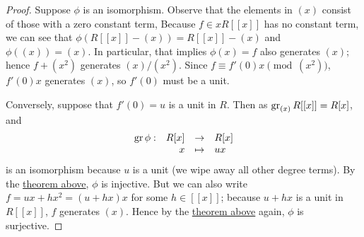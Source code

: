 \begin{proof}
    Suppose \(\phi\) is an isomorphism.
    Observe that the elements in \((x)\) consist of those with a zero constant term,
    Because \(f \in xR[[x]]\) has no constant term,
    we can see that \(\phi(R[[x]]-(x)) = R[[x]] - (x)\) and \(\phi((x)) = (x)\).
    In particular, that implies \(\phi(x) = f\) also generates \((x)\);
    hence \(f + (x^2)\) generates \((x)/(x^2)\).
    Since \(f \equiv f'(0)x \pmod{(x^2)}\), \(f'(0)x\) generates \((x)\), so \(f'(0)\) must be a unit.

    Conversely, suppose that \(f'(0) = u\) is a unit in \(R\).
    Then as \(\operatorname{gr}_{(x)} R[[x]] = R[x]\), and
    \begin{equation*}
        \begin{array}{rrcl} {\operatorname{gr}\phi}: & {R[x]} &\to & {R[x]} \\ & {x} &\mapsto & {ux} \end{array}
    \end{equation*}
    is an isomorphism because \(u\) is a unit (we wipe away all other degree terms).
    By the \hyperref[thm:power-series-completions]{theorem above},
    \(\phi\) is injective.
    But we can also write \(f = ux + hx^2 = (u+hx)x\) for some \(h \in [[x]]\);
    because \(u+hx\) is a unit in \(R[[x]]\), \(f\) generates \((x)\).
    Hence by the \hyperref[thm:power-series-completions]{theorem above} again,
    \(\phi\) is surjective.
\end{proof}

